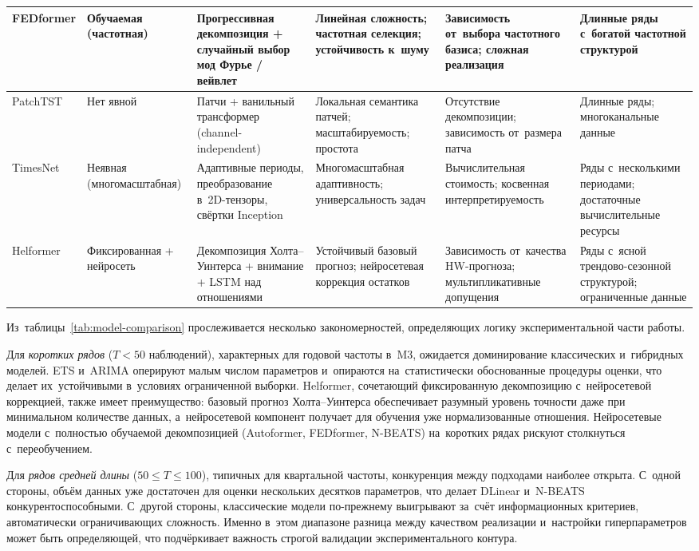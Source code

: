 \begin{table}[H]
\begin{tabular}{|p{1.4cm}|p{1.5cm}|p{2.6cm}|p{2.6cm}|p{2.6cm}|p{2.6cm}|}
FEDformer &
Обучаемая (частотная) &
Прогрессивная декомпозиция + случайный выбор мод Фурье / вейвлет &
Линейная сложность; частотная селекция; устойчивость к~шуму &
Зависимость от~выбора частотного базиса; сложная реализация &
Длинные ряды с~богатой частотной структурой \\
\hline

PatchTST &
Нет явной &
Патчи + ванильный трансформер (channel-independent) &
Локальная семантика патчей; масштабируемость; простота &
Отсутствие декомпозиции; зависимость от~размера патча &
Длинные ряды; многоканальные данные \\
\hline

TimesNet &
Неявная (много\-масштабная) &
Адаптивные периоды, преобразование в~2D-тензоры, свёртки Inception &
Многомасштабная адаптивность; универсальность задач &
Вычислительная стоимость; косвенная интерпретируемость &
Ряды с~несколькими периодами; достаточные вычислительные ресурсы \\
\hline

Helformer &
Фиксиро\-ванная + нейросеть &
Декомпозиция Холта--Уинтерса + внимание + LSTM над отношениями &
Устойчивый базовый прогноз; нейросетевая коррекция остатков &
Зависимость от~качества HW-прогноза; мультипликативные допущения &
Ряды с~ясной трендово-сезонной структурой; ограниченные данные \\
\hline

\end{tabular}
\end{table}

Из~таблицы~\ref{tab:model-comparison} прослеживается несколько закономерностей,
определяющих логику экспериментальной части работы.

Для \textit{коротких рядов} ($T < 50$ наблюдений), характерных для
годовой частоты в~M3, ожидается доминирование классических и~гибридных
моделей.  ETS и~ARIMA оперируют малым числом параметров и~опираются
на~статистически обоснованные процедуры оценки, что делает их~устойчивыми
в~условиях ограниченной выборки.  Helformer, сочетающий фиксированную
декомпозицию с~нейросетевой коррекцией, также имеет преимущество: базовый
прогноз Холта--Уинтерса обеспечивает разумный уровень точности даже при
минимальном количестве данных, а~нейросетевой компонент получает для
обучения уже нормализованные отношения.  Нейросетевые модели с~полностью
обучаемой декомпозицией (Autoformer, FEDformer, N-BEATS) на~коротких
рядах рискуют столкнуться с~переобучением.

Для \textit{рядов средней длины} ($50 \leq T \leq 100$), типичных для
квартальной частоты, конкуренция между подходами наиболее открыта.  С~одной
стороны, объём данных уже достаточен для оценки нескольких десятков
параметров, что делает DLinear и~N-BEATS конкурентоспособными.  С~другой
стороны, классические модели по-прежнему выигрывают за~счёт
информационных критериев, автоматически ограничивающих сложность.
Именно в~этом диапазоне разница между качеством реализации и~настройки
гиперпараметров может быть определяющей, что подчёркивает важность
строгой валидации экспериментального контура.

